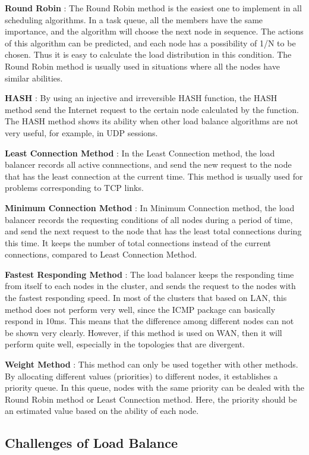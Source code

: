 \textbf{Round Robin} : The Round Robin method is the easiest one to implement in all scheduling algorithms. In a task queue, all the members have the same importance, and the algorithm will choose the next node in sequence. The actions of this algorithm can be predicted, and each node has a possibility of 1/N to be chosen. Thus it is easy to calculate the load distribution in this condition. The Round Robin method is usually used in situations where all the nodes have similar abilities.

\textbf{HASH} : By using an injective and irreversible HASH function, the HASH method send the Internet request to the certain node calculated by the function. The HASH method shows its ability when other load balance algorithms are not very useful, for example, in UDP sessions. 

\textbf{Least Connection Method} : In the Least Connection method, the load balancer records all active connnections, and send the new request to the node that has the least connection at the current time. This method is usually used for problems corresponding to TCP links.

\textbf{Minimum Connection Method} : In Minimum Connection method, the load balancer records the requesting conditions of all nodes during a period of time, and send the next request to the node that has the least total connections during this time. It keeps the number of total connections instead of the current connections, compared to Least Connection Method.

\textbf{Fastest Responding Method} : The load balancer keeps the responding time from itself to each nodes in the cluster, and sends the request to the nodes with the fastest responding speed. In most of the clusters that based on LAN, this method does not perform very well, since the ICMP package can basically respond in 10ms. This means that the difference among different nodes can not be shown very clearly. However, if this method is used on WAN, then it will perform quite well, especially in the topologies that are divergent.

\textbf{Weight Method} : This method can only be used together with other methods. By allocating different values (priorities) to different nodes, it establishes a priority queue. In this queue, nodes with the same priority can be dealed with the Round Robin method or Least Connection method. Here, the priority should be an estimated value based on the ability of each node.

\subsection{Challenges of Load Balance}
\label{sec:Challenges of Load Balance}

